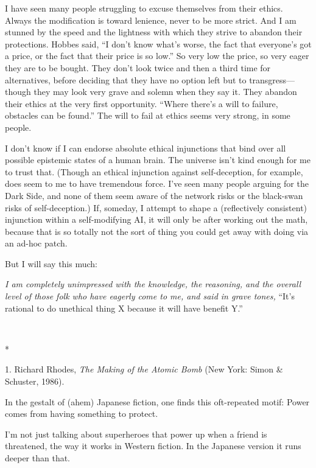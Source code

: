 {
 I have seen many people struggling to excuse themselves from their
ethics. Always the modification is toward lenience, never to be more
strict. And I am stunned by the speed and the lightness with which they
strive to abandon their protections. Hobbes said, ``I
don't know what's worse, the fact that
everyone's got a price, or the fact that their price is
so low.'' So very low the price, so very eager they
are to be bought. They don't look twice and then a
third time for alternatives, before deciding that they have no option
left but to transgress---though they may look very grave and solemn
when they say it. They abandon their ethics at the very first
opportunity. ``Where there's a will to
failure, obstacles can be found.'' The will to fail
at ethics seems very strong, in some people.}

{
 I don't know if I can endorse absolute ethical
injunctions that bind over all possible epistemic states of a human
brain. The universe isn't kind enough for me to trust
that. (Though an ethical injunction against self-deception, for
example, does seem to me to have tremendous force. I've
seen many people arguing for the Dark Side, and none of them seem aware
of the network risks or the black-swan risks of self-deception.) If,
someday, I attempt to shape a (reflectively consistent) injunction
within a self-modifying AI, it will only be after working out the math,
because that is so totally not the sort of thing you could get away
with doing via an ad-hoc patch.}

{
 But I will say this much:}

{
 \textit{I am completely unimpressed with the knowledge, the
reasoning, and the overall level of those folk who have eagerly come to
me, and said in grave tones,} ``It's
rational to do unethical thing X because it will have benefit
Y.''}

{\centering
 \ ~
\par}

{\centering
 *
\par}


\bigskip

{
 1. Richard Rhodes, \textit{The Making of the Atomic Bomb} (New
York: Simon \& Schuster, 1986).}


{
 In the gestalt of (ahem) Japanese fiction, one finds this
oft-repeated motif: Power comes from having something to protect. }

{
 I'm not just talking about superheroes that power
up when a friend is threatened, the way it works in Western fiction. In
the Japanese version it runs deeper than that.}

